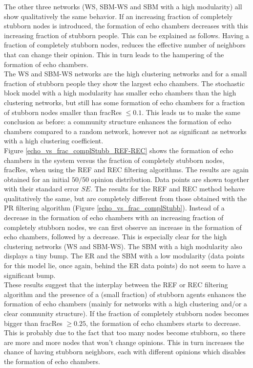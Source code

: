 \documentclass[11 pt , letterpaper , twoside , openright]{book}
\begin{document}
The other three networks (WS, SBM-WS and SBM with a high modularity) all show qualitatively the same behavior. If an increasing fraction of completely stubborn nodes is introduced, the formation of echo chambers decreases with this increasing fraction of stubborn people. This can be explained as follows. Having a fraction of completely stubborn nodes, reduces the effective number of neighbors that can change their opinion. This in turn leads to the hampering of the formation of echo chambers.\\
The WS and SBM-WS networks are the high clustering networks and for a small fraction of stubborn people they show the largest echo chambers. The stochastic block model with a high modularity has smaller echo chambers than the high clustering networks, but still has some formation of echo chambers for a fraction of stubborn nodes smaller than fracRes $\leqslant 0.1$. This leads us to make the same conclusion as before: a community structure enhances the formation of echo chambers compared to a random network, however not as significant as networks with a high clustering coefficient. \\
\newline
Figure \ref{echo_vs_frac_complStubb_REF-REC} shows the formation of echo chambers in the system versus the fraction of completely stubborn nodes, fracRes, when using the REF and REC filtering algorithms. The results are again obtained for an initial $50/50$ opinion distribution. Data points are shown together with their standard error $SE$. The results for the REF and REC method behave qualitatively the same, but are completely different from those obtained with the PR filtering algorithm (Figure \ref{echo_vs_frac_complStubb}). Instead of a decrease in the formation of echo chambers with an increasing fraction of completely stubborn nodes, we can first observe an increase in the formation of echo chambers, followed by a decrease. This is especially clear for the high clustering networks (WS and SBM-WS). The SBM with a high modularity also displays a tiny bump. The ER and the SBM with a low modularity (data points for this model lie, once again, behind the ER data points) do not seem to have a significant bump.\\
These results suggest that the interplay between the REF or REC filtering algorithm and the presence of a (small fraction) of stubborn agents enhances the formation of echo chambers (mainly for networks with a high clustering and/or a clear community structure). %
If the fraction of completely stubborn nodes becomes bigger than fracRes $\geqslant 0.25$, the formation of echo chambers starts to decrease. This is probably due to the fact that too many nodes become stubborn, so there are more and more nodes that won't change opinions. This in turn increases the chance of having stubborn neighbors, each with different opinions which disables the formation of echo chambers.
\end{document}
